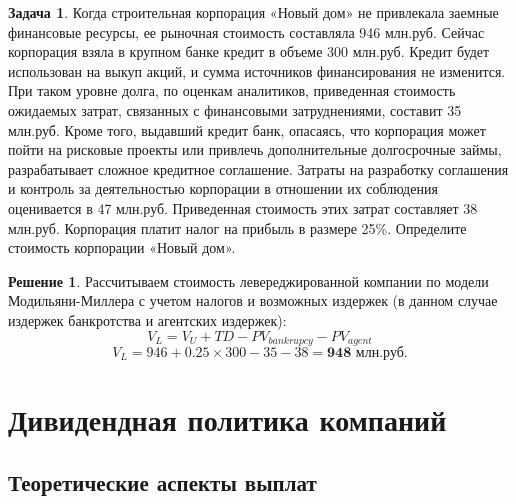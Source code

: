\documentclass[a4paper, 14pt]{article}
\theoremstyle{plain} %
\theoremstyle{definition} %
\newtheorem*{solution}{Решение}
\newtheorem{problem}{Задача}[subsection]
\theoremstyle{remark} %
\begin{document}
\newpage

\begin{problem}
	Когда строительная корпорация «Новый дом» не привлекала заемные финансовые ресурсы, ее рыночная стоимость составляла 946 млн.руб. Сейчас корпорация взяла в крупном банке кредит в объеме 300 млн.руб. Кредит будет использован на выкуп акций, и сумма источников финансирования не изменится. При таком уровне долга, по оценкам аналитиков, приведенная стоимость ожидаемых затрат, связанных с финансовыми затруднениями, составит 35 млн.руб. Кроме того, выдавший кредит банк, опасаясь, что корпорация может пойти на рисковые проекты или привлечь дополнительные долгосрочные займы, разрабатывает сложное кредитное соглашение. Затраты на разработку соглашения и контроль за деятельностью корпорации в отношении их соблюдения оценивается в 47 млн.руб. Приведенная стоимость этих затрат составляет 38 млн.руб. Корпорация платит налог на прибыль в размере 25\%. Определите стоимость корпорации «Новый дом».
	\begin{solution}
		Рассчитываем стоимость левереджированной компании по модели Модильяни-Миллера с учетом налогов и возможных издержек (в данном случае издержек банкротства и агентских издержек):
		\[V_{L} = V_{U} + TD - PV_{bankrupcy} - PV_{agent}\]
		\[V_{L} = 946 + 0.25\times 300 - 35 - 38 = \textbf{948 млн.руб.}\]
	\end{solution}
\end{problem}

\section{Дивидендная политика компаний}
\subsection{Теоретические аспекты выплат}
\end{document}

